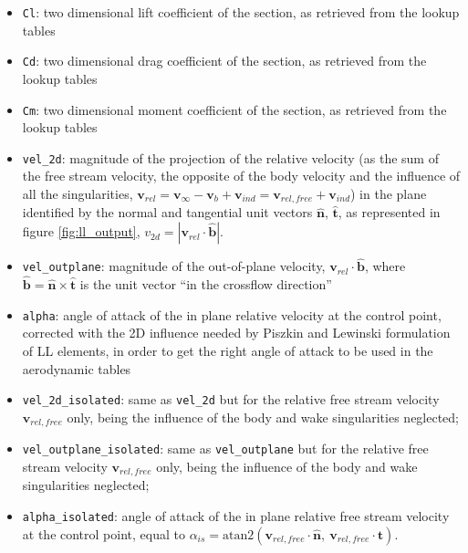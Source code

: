 \begin{itemize}
    \item \texttt{Cl}: two dimensional lift coefficient of the section, as retrieved from the lookup tables
    \item \texttt{Cd}: two dimensional drag coefficient of the section, as retrieved from the lookup tables
    \item \texttt{Cm}: two dimensional moment coefficient of the section, as retrieved from the lookup tables
    \item \texttt{vel\_2d}: magnitude of the projection of the relative velocity (as the sum of the free stream velocity, the opposite of the body velocity and the influence of all the singularities, $\mathbf{v}_{rel} = \mathbf{v}_\infty - \mathbf{v}_b + \mathbf{v}_{ind} = \mathbf{v}_{rel,free} + \mathbf{v}_{ind}$) in the plane identified by the normal and tangential unit vectors $\mathbf{\hat{n}}$, $\mathbf{\hat{t}}$, as represented in figure \ref{fig:ll_output},
    $v_{2d} = | \mathbf{v}_{rel} \cdot \mathbf{\hat{b}}|$.
    \item \texttt{vel\_outplane}: magnitude of the out-of-plane velocity, $\mathbf{v}_{rel} \cdot \mathbf{\hat{b}}$, where $\mathbf{\hat{b}} = \mathbf{\hat{n}} \times \mathbf{\hat{t}}$ is the unit vector ``in the crossflow direction''
    \item \texttt{alpha}: angle of attack of the in plane relative velocity at the control point, corrected with the 2D influence needed by Piszkin and Lewinski formulation of LL elements, in order to get the right angle of attack to be used in the aerodynamic tables
    \item \texttt{vel\_2d\_isolated}: same as \texttt{vel\_2d} but for the relative free stream velocity $\mathbf{v}_{rel,free}$ only, being the influence of the body and wake singularities neglected;
    \item \texttt{vel\_outplane\_isolated}: same as \texttt{vel\_outplane} but for the relative free stream velocity $\mathbf{v}_{rel,free}$ only, being the influence of the body and wake singularities neglected;
    \item \texttt{alpha\_isolated}: angle of attack of the in plane relative free stream velocity at the control point, equal to $\alpha_{is} = \text{atan2}( \mathbf{v}_{rel,free} \cdot \mathbf{\hat{n}}, \ \mathbf{v}_{rel,free} \cdot \mathbf{\hat{t}})$.
\end{itemize}

